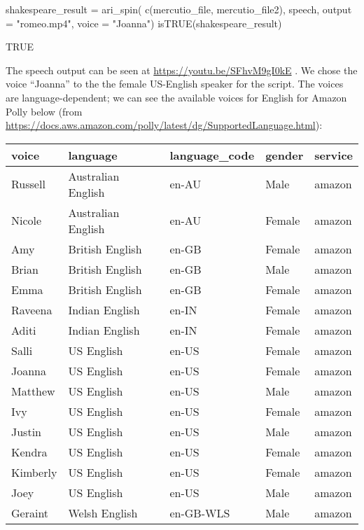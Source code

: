 \begin{Schunk}
\begin{Sinput}
shakespeare_result = ari_spin(
  c(mercutio_file, mercutio_file2),
  speech, output = "romeo.mp4", voice = "Joanna")
isTRUE(shakespeare_result)
\end{Sinput}
\end{Schunk}

\begin{Schunk}
\begin{Soutput}
[1] TRUE
\end{Soutput}
\end{Schunk}

The speech output can be seen at \url{https://youtu.be/SFhvM9gI0kE} . We
chose the voice ``Joanna'' to the the female US-English speaker for the
script. The voices are language-dependent; we can see the available
voices for English for Amazon Polly below (from
\url{https://docs.aws.amazon.com/polly/latest/dg/SupportedLanguage.html}):

\begin{Schunk}

\begin{tabular}{l|l|l|l|l}
\hline
voice & language & language\_code & gender & service\\
\hline
Russell & Australian English & en-AU & Male & amazon\\
\hline
Nicole & Australian English & en-AU & Female & amazon\\
\hline
Amy & British English & en-GB & Female & amazon\\
\hline
Brian & British English & en-GB & Male & amazon\\
\hline
Emma & British English & en-GB & Female & amazon\\
\hline
Raveena & Indian English & en-IN & Female & amazon\\
\hline
Aditi & Indian English & en-IN & Female & amazon\\
\hline
Salli & US English & en-US & Female & amazon\\
\hline
Joanna & US English & en-US & Female & amazon\\
\hline
Matthew & US English & en-US & Male & amazon\\
\hline
Ivy & US English & en-US & Female & amazon\\
\hline
Justin & US English & en-US & Male & amazon\\
\hline
Kendra & US English & en-US & Female & amazon\\
\hline
Kimberly & US English & en-US & Female & amazon\\
\hline
Joey & US English & en-US & Male & amazon\\
\hline
Geraint & Welsh English & en-GB-WLS & Male & amazon\\
\hline
\end{tabular}

\end{Schunk}

